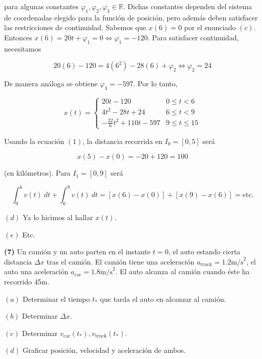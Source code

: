\documentclass[12pt]{article}
\theoremstyle{definition}
\begin{document}
para algunas constantes $\varphi_1,  \varphi_2, \varphi_3 \in \mathbb{R}$.
Dichas constantes dependen del sistema de coordenadas elegido para la función de
posición, pero además deben satisfacer las restricciones de continuidad. Sabemos
que $x(6) = 0$ por el enunciado $(c)$. Entonces $x(6) = 20t + \varphi_1 = 0 \iff
\varphi_1 = -120$. Para satisfacer continuidad, necesitamos 

\begin{equation*}
    20(6) - 120 = 4(6^2) - 28(6) + \varphi_2 \iff \varphi_2 = 24
\end{equation*}

De manera análoga se obtiene $\varphi_3= -597$. Por lo tanto, 

\begin{equation*}
    x(t) = \begin{cases}
        20t - 120 & 0 \leq t < 6 \\ 
        4t^2 -28t  + 24 & 6 \leq t < 9 \\ 
        -\frac{22}{6}t^2 + 110t -597 & 9 \leq t \leq 15
    \end{cases}
\end{equation*}

Usando la ecuación $(1)$, la distancia recorrida en $I_0 = [0, 5]$ será 

\begin{equation*}
    x(5) - x(0) = -20 + 120 = 100
\end{equation*}

(en kilómetros). Para $I_1 = [0, 9]$ será 

\begin{equation*}
    \int_0^6 v(t) ~ dt + \int_6^9 v(t) ~ dt = \left[ x(6) - x(0) \right] +
    \left[ x(9) - x(6) \right] = \text{etc.}
\end{equation*}

$(d)$ Ya lo hicimos al hallar $x(t)$. 

$(e)$ Etc.

\pagebreak 

\begin{shaded}
    \textbf{(7)} Un camión y un auto parten en el instante $t=0$, el auto
    estando cierta distancia $\Delta x$ tras el camión. El camión  tiene una
    aceleración $a_{\text{truck}} = 1.2\text{m/s}^2$, el auto una aceleración
    $a_{\text{car}} = 1.8\text{m/s}^2$. El auto alcanza al camión cuando éste ha
    recorrido 45m. 

    $(a)$ Determinar el tiempo $t_*$ que tarda el auto en alcanzar al camión.

    $(b)$ Determinar $\Delta x$. 

    $(c)$ Determinar $v_{\text{car}}(t_*), v_{\text{truck}}(t_*)$.

    $(d)$ Graficar posición, velocidad y aceleración de ambos.
\end{shaded}
\end{document}
